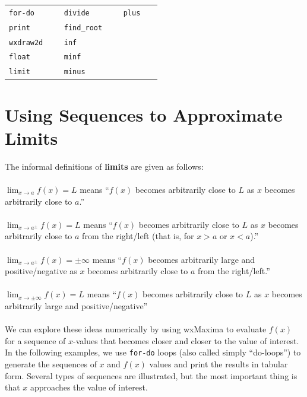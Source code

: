 \documentclass[10.5pt,twoside]{report}
\theoremstyle{definition}
\begin{document}
\vspace*{\fill}

\minitoc

\vspace*{\fill}


\newline
\newline

\begin{tabular}{l l l}
 \verb|for-do   |   &\verb|divide   |   &\verb|plus   |   \\
 \verb|print   |   &\verb|find_root   |   &\verb|   |   \\
 \verb|wxdraw2d   |   &\verb|inf   |   &\verb|   |   \\
 \verb|float   |   &\verb|minf   |   &\verb|   |   \\
 \verb|limit   |   &\verb|minus   |   &\verb|   |   \\
\end{tabular}



\pagebreak

\section{Using Sequences to Approximate Limits}\label{Using Sequences to Approximate Limits}

The informal definitions of \textbf{limits} are given as follows:\\
${}$\\
$\lim_{x \to a} f(x)=L$ means ``$f(x)$ becomes arbitrarily close to $L$ as $x$ becomes arbitrarily close to $a$.''\\
${}$\\
$\lim_{x \to a^{\pm}} f(x)=L$ means ``$f(x)$ becomes arbitrarily close to $L$ as $x$ becomes arbitrarily close to $a$ from the right/left (that is, for $x>a$ or $x<a$).''\\
${}$\\
$\lim_{x \to a^{\pm}} f(x)=\pm \infty$ means ``$f(x)$ becomes arbitrarily large and positive/negative as $x$ becomes arbitrarily close to $a$ from the right/left.''\\
${}$\\
$\lim_{x \to \pm\infty} f(x)=L$ means ``$f(x)$ becomes arbitrarily close to $L$ as $x$ becomes arbitrarily large and positive/negative''\\
${}$\\
We can explore these ideas numerically by using wxMaxima to evaluate $f(x)$ for a sequence of $x$-values that becomes closer and closer to the value of interest.  In the following examples, we use \verb|for-do| loops (also called simply ``do-loops'') to generate the sequences of $x$ and $f(x)$ values and print the results in tabular form.  Several types of sequences are illustrated, but the most important thing is that $x$ approaches the value of interest.
\end{document}
